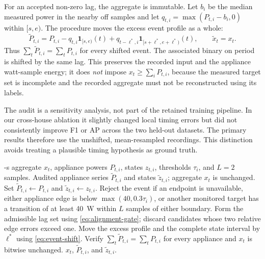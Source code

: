 \documentclass[conference]{IEEEtran}
\begin{document}
For an accepted non-zero lag, the aggregate is immutable.  Let $b_i$ be the median measured power in the nearby off samples and let $q_{t,i}=\max(P_{t,i}-b_i,0)$ within $[s,e)$.  The procedure moves the excess event profile as a whole:
\begin{equation}
\widetilde{P}_{t,i}=P_{t,i}-q_{t,i}\mathbf{1}_{[s,e)}(t)
+q_{t-\ell^*,i}\mathbf{1}_{[s+\ell^*,e+\ell^*)}(t),
\qquad \widetilde{x}_t=x_t.
\label{eq:event-shift}
\end{equation}
Thus $\sum_t\widetilde{P}_{t,i}=\sum_tP_{t,i}$ for every shifted event.  The associated binary on period is shifted by the same lag.  This preserves the recorded input and the appliance watt-sample energy; it does \emph{not} impose $x_t\geq\sum_iP_{t,i}$, because the measured target set is incomplete and the recorded aggregate must not be reconstructed using its labels.

The audit is a sensitivity analysis, not part of the retained training pipeline.  In our cross-house ablation it slightly changed local timing errors but did not consistently improve F1 or AP across the two held-out datasets.  The primary results therefore use the unshifted, mean-resampled recordings.  This distinction avoids treating a plausible timing hypothesis as ground truth.

\begin{algorithm}[!t]
\caption{Conservative two-edge event timing audit.}
\label{alg:alignment}
\begin{algorithmic}[1]
-s aggregate $x_t$, appliance powers $P_{t,i}$, states $z_{t,i}$, thresholds $\tau_i$, and $L=2$ samples.
\ENSURE Audited appliance series $\widetilde{P}_{t,i}$ and states $\widetilde{z}_{t,i}$; aggregate $x_t$ is unchanged.
\STATE Set $\widetilde{P}_{t,i}\leftarrow P_{t,i}$ and $\widetilde{z}_{t,i}\leftarrow z_{t,i}$.
    \FOR{each complete on period $[s,e)$ in $z_{t,i}$}
        \STATE Reject the event if an endpoint is unavailable, either appliance edge is below $\max(40,0.3\tau_i)$, or another monitored target has a transition of at least 40~W within $L$ samples of either boundary.
        \STATE Form the admissible lag set using \eqref{eq:alignment-gate}; discard candidates whose two relative edge errors exceed one.
            \STATE Move the excess profile and the complete state interval by $\ell^*$ using \eqref{eq:event-shift}.
        \ENDIF
    \ENDFOR
\ENDFOR
\STATE Verify $\sum_t\widetilde{P}_{t,i}=\sum_tP_{t,i}$ for every appliance and $x_t$ is bitwise unchanged.
\RETURN $x_t$, $\widetilde{P}_{t,i}$, and $\widetilde{z}_{t,i}$.
\end{algorithmic}
\end{algorithm}
\end{document}
